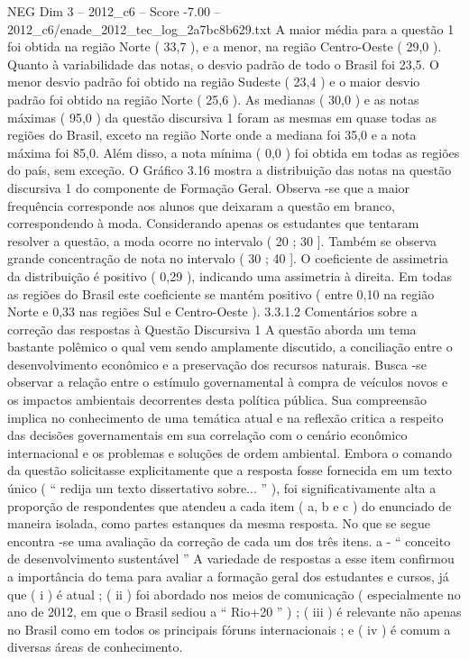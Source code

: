 \begin{textsample}{NEG Dim 3 – 2012\_c6 – Score -7.00 – 2012\_c6/enade\_2012\_tec\_log\_2a7bc8b629.txt}
A maior média para a questão 1 foi obtida na região Norte ( 33,7 ), e a menor, na região Centro-Oeste ( 29,0 ).
Quanto à variabilidade das notas, o desvio padrão de todo o Brasil foi 23,5.
O menor desvio padrão foi obtido na região Sudeste ( 23,4 ) e o maior desvio padrão foi obtido na região Norte ( 25,6 ).
As medianas ( 30,0 ) e as notas máximas ( 95,0 ) da questão discursiva 1 foram as mesmas em quase todas as regiões do Brasil, exceto na região Norte onde a mediana foi 35,0 e a nota máxima foi 85,0.
Além disso, a nota mínima ( 0,0 ) foi obtida em todas as regiões do país, sem exceção.
O Gráfico 3.16 mostra a distribuição das notas na questão discursiva 1 do componente de Formação Geral.
Observa -se que a maior frequência corresponde aos alunos que deixaram a questão em branco, correspondendo à moda.
Considerando apenas os estudantes que tentaram resolver a questão, a moda ocorre no intervalo ( 20 ; 30 ].
Também se observa grande concentração de nota no intervalo ( 30 ; 40 ].
O coeficiente de assimetria da distribuição é positivo ( 0,29 ), indicando uma assimetria à direita.
Em todas as regiões do Brasil este coeficiente se mantém positivo ( entre 0,10 na região Norte e 0,33 nas regiões Sul e Centro-Oeste ). 3.3.1.2 Comentários sobre a correção das respostas à Questão Discursiva 1 A questão aborda um tema bastante polêmico o qual vem sendo amplamente discutido, a conciliação entre o desenvolvimento econômico e a preservação dos recursos naturais.
Busca -se observar a relação entre o estímulo governamental à compra de veículos novos e os impactos ambientais decorrentes desta política pública.
Sua compreensão implica no conhecimento de uma temática atual e na reflexão critica a respeito das decisões governamentais em sua correlação com o cenário econômico internacional e os problemas e soluções de ordem ambiental.
Embora o comando da questão solicitasse explicitamente que a resposta fosse fornecida em um texto único ( “ redija um texto dissertativo sobre... ” ), foi significativamente alta a proporção de respondentes que atendeu a cada item ( a, b e c ) do enunciado de maneira isolada, como partes estanques da mesma resposta.
No que se segue encontra -se uma avaliação da correção de cada um dos três itens. a - “ conceito de desenvolvimento sustentável ” A variedade de respostas a esse item confirmou a importância do tema para avaliar a formação geral dos estudantes e cursos, já que ( i ) é atual ; ( ii ) foi abordado nos meios de comunicação ( especialmente no ano de 2012, em que o Brasil sediou a “ Rio+20 ” ) ; ( iii ) é relevante não apenas no Brasil como em todos os principais fóruns internacionais ; e ( iv ) é comum a diversas áreas de conhecimento.

\end{textsample}
